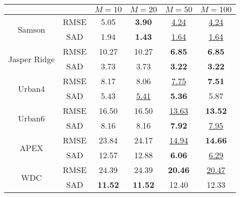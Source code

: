 \begin{tabular}{c | c | c c c c}
  \toprule
  & & $M=10$  & $M=20$ & $M=50$ & $M=100$ \\
  \hline
  \multirow{2}{*}{Samson}
  & RMSE & 5.05 & \textbf{3.90} & \underline{4.24} & \underline{4.24} \\
  & SAD & 1.94 & \textbf{1.43} & \underline{1.64} &\underline{1.64} \\
  \hline
  \multirow{2}{*}{Jasper Ridge}
  & RMSE & 10.27 & 10.27 & \textbf{6.85} & \textbf{6.85} \\
  & SAD & 3.73 & 3.73 & \textbf{3.22} & \textbf{3.22} \\
  \hline
  \multirow{2}{*}{Urban4}
  & RMSE & 8.17 & 8.06 & \underline{7.75} & \textbf{7.51} \\
  & SAD & 5.43 & \underline{5.41} & \textbf{5.36} & 5.87 \\
  \hline
  \multirow{2}{*}{Urban6}
  & RMSE & 16.50 & 16.50 & \underline{13.63} &\textbf{13.52} \\
  & SAD & 8.16 & 8.16 & \textbf{7.92} & \underline{7.95} \\
  \hline
  \multirow{2}{*}{APEX}
  & RMSE & 23.84 & 24.17 & \underline{14.94} & \textbf{14.66} \\
  & SAD & 12.57 & 12.88 & \textbf{6.06} &\underline{6.29} \\
  \hline
  \multirow{2}{*}{WDC}
  & RMSE & 24.39 & 24.39 & \textbf{20.46} &\underline{20.47} \\
  & SAD & \textbf{11.52} & \textbf{11.52} & 12.40 & 12.33 \\
  \bottomrule
\end{tabular}